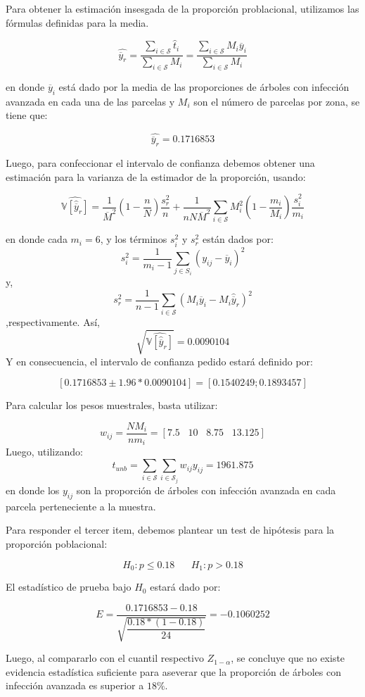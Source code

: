 \begin{solution}
Para obtener la estimación insesgada de la proporción problacional, utilizamos las fórmulas definidas para la media.

$$\widehat{\overline{y}_r}=\dfrac{\sum_{i\in \mathcal{S}}\hat{t}_i}{\sum_{i\in \mathcal{S}}M_i}=\dfrac{\sum_{i\in \mathcal{S}}M_i \overline{y}_i}{\sum_{i\in \mathcal{S}}M_i}$$

en donde $\overline{y}_i$ está dado por la media de las proporciones de árboles con infección avanzada en cada una de las parcelas y $M_i$ son el número de parcelas por zona, se tiene que:

$$\widehat{\overline{y}_r}=0.1716853$$

Luego, para confeccionar el intervalo de confianza debemos obtener una estimación para la varianza de la estimador de la proporción, usando:

$$\widehat{\mathbb{V}[ \hat{\overline{y}}_{r} ]}=\dfrac{1}{\overline{M}^2}\left( 1- \dfrac{n}{N}\right) \dfrac{s_{r}^{2}}{n}+\dfrac{1}{nN\overline{M}^2}\sum_{i\in \mathcal{S}} M_{i}^2 \left( 1 -\dfrac{m_i}{M_i}\right)\dfrac{s_{i}^{2}}{m_i} $$

en donde cada $m_i=6$, y los términos $s_{i}^2$ y $s_{r}^{2}$ están dados por:
$$\displaystyle s_{i}^{2}=\dfrac{1}{m_i-1}\sum_{j\in S_i} \left( y_{ij} - \overline{y}_i\right)^2$$
y, 
$$s_{r}^2=\dfrac{1}{n-1}\sum_{i\in \mathcal{S}} (M_i\overline{y}_i-M_i\hat{\overline{y}}_r)^2$$
,respectivamente. Así, 
$$\sqrt{\widehat{\mathbb{V}[ \hat{\overline{y}}_{r} ]}}=0.0090104$$
Y en consecuencia, el intervalo de confianza pedido estará definido por:

$$\left[0.1716853\pm 1.96 *0.0090104\right]= \left[0.1540249;0.1893457\right]$$

Para calcular los pesos muestrales, basta utilizar:

$$w_{ij}=\dfrac{NM_i}{nm_i}=\left[7.5\hspace{10pt} 10\hspace{10pt} 8.75\hspace{10pt} 13.125\right]$$
Luego, utilizando:
$$\widehat{t}_{unb}= \sum_{i\in \mathcal{S}} \sum_{i\in \mathcal{S}_j} w_{ij}y_{ij}=1961.875$$
en donde los $y_{ij}$ son la proporción de árboles con infección avanzada en cada parcela perteneciente a la muestra.

Para responder el tercer item, debemos plantear un test de hipótesis para la proporción poblacional:

$$H_0: p  \leq 0.18 \hspace{20pt} H_1: p > 0.18$$

El estadístico de prueba bajo $H_0$ estará dado por:

$$E=\dfrac{0.1716853-0.18}{\sqrt{\dfrac{0.18*(1-0.18)}{24}}}=-0.1060252$$

Luego, al compararlo con el cuantil respectivo $Z_{1-\alpha}$, se concluye que no existe evidencia estadística suficiente para aseverar que la proporción de árboles con infección avanzada es superior a $18\%$.
\end{solution}